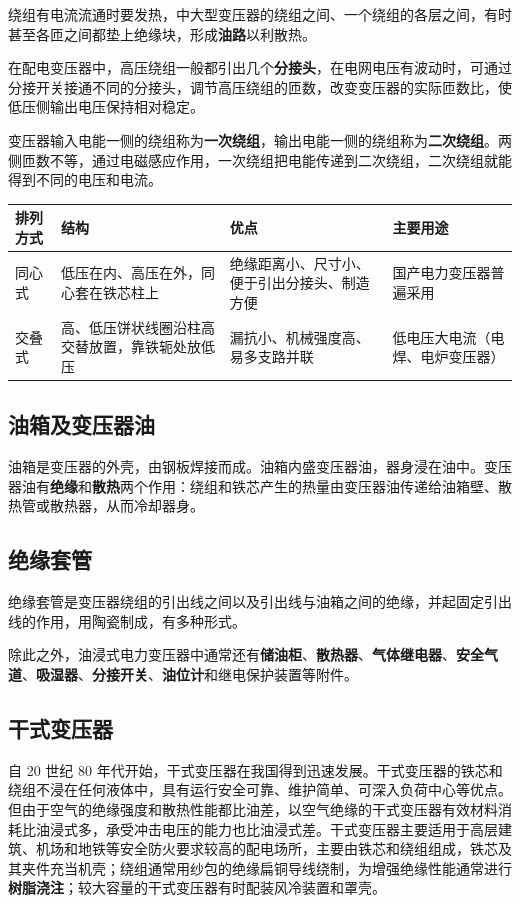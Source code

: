 绕组有电流流通时要发热，中大型变压器的绕组之间、一个绕组的各层之间，有时甚至各匝之间都垫上绝缘块，形成\textbf{油路}以利散热。

在配电变压器中，高压绕组一般都引出几个\textbf{分接头}，在电网电压有波动时，可通过分接开关接通不同的分接头，调节高压绕组的匝数，改变变压器的实际匝数比，使低压侧输出电压保持相对稳定。

变压器输入电能一侧的绕组称为\textbf{一次绕组}，输出电能一侧的绕组称为\textbf{二次绕组}。两侧匝数不等，通过电磁感应作用，一次绕组把电能传递到二次绕组，二次绕组就能得到不同的电压和电流。

\begin{center}
\begin{tabular}{@{}p{1.7cm}p{4.4cm}p{3.3cm}p{3.6cm}@{}}
\toprule
排列方式 & 结构 & 优点 & 主要用途 \\
\midrule
同心式 & 低压在内、高压在外，同心套在铁芯柱上 & 绝缘距离小、尺寸小、便于引出分接头、制造方便 & 国产电力变压器普遍采用 \\
交叠式 & 高、低压饼状线圈沿柱高交替放置，靠铁轭处放低压 & 漏抗小、机械强度高、易多支路并联 & 低电压大电流（电焊、电炉变压器） \\
\bottomrule
\end{tabular}
\end{center}

\subsection{油箱及变压器油}
油箱是变压器的外壳，由钢板焊接而成。油箱内盛变压器油，器身浸在油中。变压器油有\textbf{绝缘}和\textbf{散热}两个作用：绕组和铁芯产生的热量由变压器油传递给油箱壁、散热管或散热器，从而冷却器身。

\subsection{绝缘套管}
绝缘套管是变压器绕组的引出线之间以及引出线与油箱之间的绝缘，并起固定引出线的作用，用陶瓷制成，有多种形式。

除此之外，油浸式电力变压器中通常还有\textbf{储油柜}、\textbf{散热器}、\textbf{气体继电器}、\textbf{安全气道}、\textbf{吸湿器}、\textbf{分接开关}、\textbf{油位计}和继电保护装置等附件。

\subsection{干式变压器}
自 20 世纪 80 年代开始，干式变压器在我国得到迅速发展。干式变压器的铁芯和绕组不浸在任何液体中，具有运行安全可靠、维护简单、可深入负荷中心等优点。但由于空气的绝缘强度和散热性能都比油差，以空气绝缘的干式变压器有效材料消耗比油浸式多，承受冲击电压的能力也比油浸式差。干式变压器主要适用于高层建筑、机场和地铁等安全防火要求较高的配电场所，主要由铁芯和绕组组成，铁芯及其夹件充当机壳；绕组通常用纱包的绝缘扁铜导线绕制，为增强绝缘性能通常进行\textbf{树脂浇注}；较大容量的干式变压器有时配装风冷装置和罩壳。

